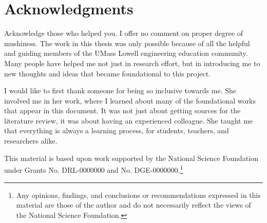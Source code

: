 \chapter*{Acknowledgments}
\renewcommand{\thefootnote}{\fnsymbol{footnote}}

Acknowledge those who helped you. I offer no comment on proper degree of mushiness. The work in this thesis was only possible because of all the helpful and guiding members of the UMass Lowell engineering education community. Many people have helped me not just in research effort, but in introducing me to new thoughts and ideas that became foundational to this project.

I would like to first thank someone for being so inclusive towards me. She involved me in her work, where I learned about many of the foundational works that appear in this document. It was not just about getting sources for the literature review, it was about having an experienced colleague.  She taught me that everything is always a learning process, for students, teachers, and researchers alike.

This material is based upon work supported by the National Science Foundation under Grants No. DRL-0000000 and No. DGE-0000000.\footnote{Any opinions, findings, and conclusions or recommendations expressed in this material are those of the author and do not necessarily reflect the views of the National Science Foundation.}

\renewcommand{\thefootnote}{\arabic{footnote}} %
